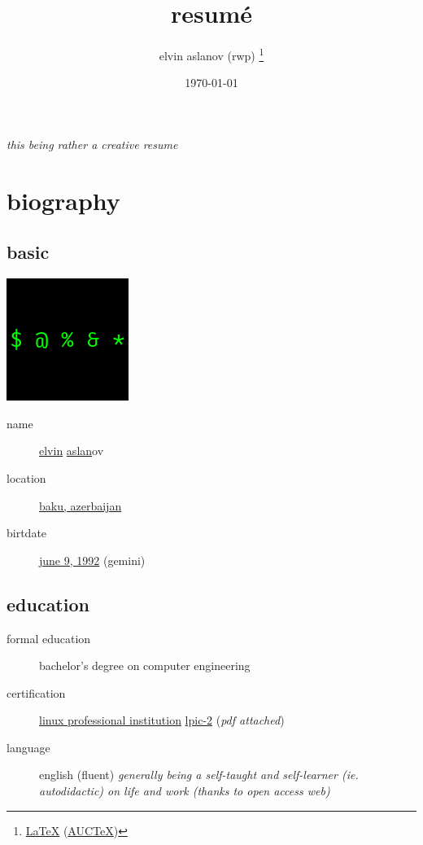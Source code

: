 \documentclass{article}
\title{resumé}
\author{elvin aslanov (rwp) \thanks{\href{https://en.wikipedia.org/wiki/LaTeX}{\LaTeX} (\href{https://www.gnu.org/software/auctex/}{AUCTeX})}}
\date{\today}
\begin{document}
  \begin{titlepage}
    \maketitle
  \end{titlepage}
  \textit{this being rather a creative resume}

  \section{biography}
    \subsection{basic}
    \includegraphics{resume.png}
      \begin{description}
        \item[name] \href{https://en.wiktionary.org/wiki/Elvin#English}{elvin} \href{https://en.wiktionary.org/wiki/Aslan#Turkish}{aslan}ov
        \item[location] \href{https://www.openstreetmap.org/relation/2415335}{baku, azerbaijan}
        \item[birtdate] \href{https://www.timeanddate.com/date/durationresult.html?m1=06&d1=09&y1=1992}{june 9, 1992} (gemini)
      \end{description}
    \subsection{education}
      \begin{description}
        \item[formal education] bachelor's degree on computer engineering
        \item[certification] \href{https://en.wikipedia.org/wiki/Linux_Professional_Institute}{linux professional institution} \href{https://cs.lpi.org/caf/Xamman/certification/verify/LPI000307519/bafrejwgeb}{lpic-2} (\textit{pdf attached})
        \item[language] english (fluent)
          \textit{generally being a self-taught and self-learner (ie. autodidactic) on life and work (thanks to open access web)}
      \end{description}
\end{document}
